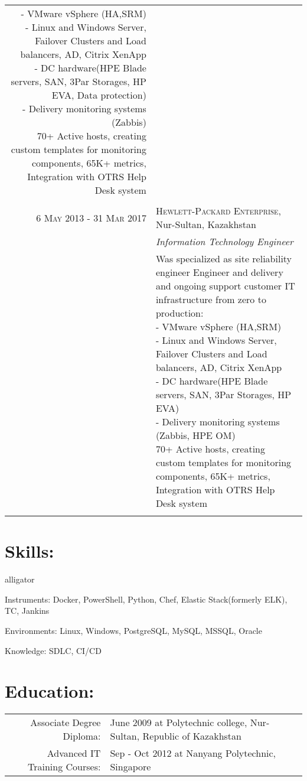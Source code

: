 \documentclass[a4paper,10pt]{article}
\begin{document}
\begin{tabular}{r|p{11cm}}
{{- VMware vSphere (HA,SRM)\newline
- Linux and Windows Server, Failover Clusters and Load balancers, AD, Citrix XenApp\newline
- DC hardware(HPE Blade servers, SAN, 3Par Storages, HP EVA, Data protection)\newline
- Delivery monitoring systems (Zabbis)\newline
70+ Active hosts, creating custom templates for monitoring components, 65K+ metrics, Integration with OTRS Help Desk system}}\\
\multicolumn{2}{c}{} \\
\textsc{6 May 2013 - 31 Mar 2017} & \textsc{Hewlett-Packard Enterprise}, Nur-Sultan, Kazakhstan \\
                                  & \emph{Information Technology Engineer}\\
& \footnotesize{\textnormal{Was specialized as site reliability engineer Engineer and delivery and ongoing support customer IT infrastructure from zero to production:\newline
- VMware vSphere (HA,SRM)\newline
- Linux and Windows Server, Failover Clusters and Load balancers, AD, Citrix XenApp\newline
- DC hardware(HPE Blade servers, SAN, 3Par Storages, HP EVA)\newline
- Delivery monitoring systems (Zabbis, HPE OM)\newline
70+ Active hosts, creating custom templates for monitoring components, 65K+ metrics, Integration with OTRS Help Desk system}}\\
\multicolumn{2}{c}{} \\
\end{tabular}
\section*{Skills:}
\begin{labeling}{alligator}
  \item [Instruments:] Docker, PowerShell, Python, Chef, Elastic Stack(formerly ELK), TC, Jankins
  \item [Environments:] Linux, Windows, PostgreSQL, MySQL, MSSQL, Oracle
  \item [Knowledge:] SDLC, CI/CD
\end{labeling}
\section*{Education:}
\begin{tabular}{r|p{11cm}}
  Associate Degree Diploma: &  June 2009 at Polytechnic college, Nur-Sultan, Republic of Kazakhstan\\
  Advanced IT Training Courses: &  Sep - Oct 2012 at Nanyang Polytechnic, Singapore\\
\end{tabular}
\end{document}
